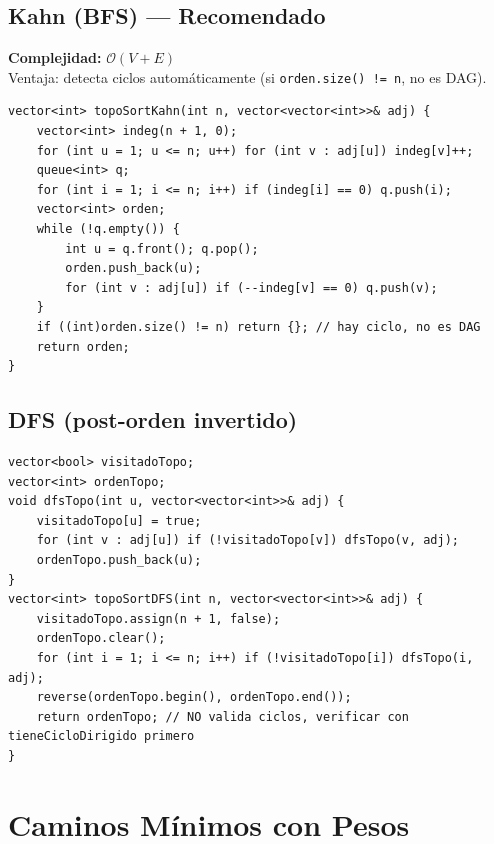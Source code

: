 \documentclass[10pt,twocolumn,letterpaper]{report}
\begin{document}
\subsection{Kahn (BFS) --- Recomendado}
\textbf{Complejidad:} $\mathcal{O}(V + E)$ \\
Ventaja: detecta ciclos automáticamente (si \texttt{orden.size() != n}, no es DAG).
\begin{lstlisting}
vector<int> topoSortKahn(int n, vector<vector<int>>& adj) {
    vector<int> indeg(n + 1, 0);
    for (int u = 1; u <= n; u++) for (int v : adj[u]) indeg[v]++;
    queue<int> q;
    for (int i = 1; i <= n; i++) if (indeg[i] == 0) q.push(i);
    vector<int> orden;
    while (!q.empty()) {
        int u = q.front(); q.pop();
        orden.push_back(u);
        for (int v : adj[u]) if (--indeg[v] == 0) q.push(v);
    }
    if ((int)orden.size() != n) return {}; // hay ciclo, no es DAG
    return orden;
}
\end{lstlisting}

\subsection{DFS (post-orden invertido)}
\begin{lstlisting}
vector<bool> visitadoTopo;
vector<int> ordenTopo;
void dfsTopo(int u, vector<vector<int>>& adj) {
    visitadoTopo[u] = true;
    for (int v : adj[u]) if (!visitadoTopo[v]) dfsTopo(v, adj);
    ordenTopo.push_back(u);
}
vector<int> topoSortDFS(int n, vector<vector<int>>& adj) {
    visitadoTopo.assign(n + 1, false);
    ordenTopo.clear();
    for (int i = 1; i <= n; i++) if (!visitadoTopo[i]) dfsTopo(i, adj);
    reverse(ordenTopo.begin(), ordenTopo.end());
    return ordenTopo; // NO valida ciclos, verificar con tieneCicloDirigido primero
}
\end{lstlisting}

\section{Caminos Mínimos con Pesos}
\end{document}
